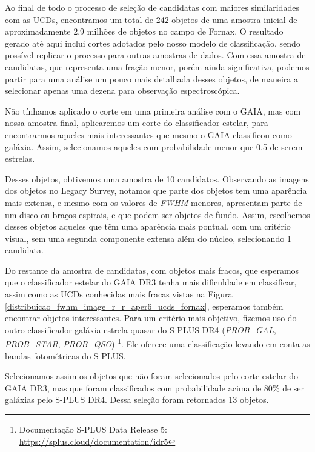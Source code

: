 Ao final de todo o processo de seleção de candidatas com maiores similaridades com as UCDs, encontramos um total de 242 objetos de uma amostra inicial de aproximadamente 2,9 milhões de objetos no campo de Fornax. O resultado gerado até aqui inclui cortes adotados pelo nosso modelo de classificação, sendo possível replicar o processo para outras amostras de dados. Com essa amostra de candidatas, que representa uma fração menor, porém ainda significativa, podemos partir para uma análise um pouco mais detalhada desses objetos, de maneira a selecionar apenas uma dezena para observação espectroscópica.

Não tínhamos aplicado o corte em uma primeira análise com o GAIA, mas com nossa amostra final, aplicaremos um corte do classificador estelar, para encontrarmos aqueles mais interessantes que mesmo o GAIA classificou como galáxia. Assim, selecionamos aqueles com probabilidade menor que 0.5 de serem estrelas.

Desses objetos, obtivemos uma amostra de 10 candidatos. Observando as imagens dos objetos no Legacy Survey, notamos que parte dos objetos tem uma aparência mais extensa, e mesmo com os valores de \textit{FWHM} menores, apresentam parte de um disco ou braços espirais, e que podem ser objetos de fundo. Assim, escolhemos desses objetos aqueles que têm uma aparência mais pontual, com um critério visual, sem uma segunda componente extensa além do núcleo, selecionando 1 candidata. 


Do restante da amostra de candidatas, com objetos mais fracos, que esperamos que o classificador estelar do GAIA DR3 tenha mais dificuldade em classificar, assim como as UCDs conhecidas mais fracas vistas na Figura \ref{distribuicao_fwhm_image_r_r_aper6_ucds_fornax}, esperamos também encontrar objetos interessantes. Para um critério mais objetivo, fizemos uso do outro classificador galáxia-estrela-quasar do S-PLUS DR4 (\textit{PROB\_GAL}, \textit{PROB\_STAR}, \textit{PROB\_QSO}) \citep{lili_classification}\footnote{Documentação S-PLUS Data Release 5: \url{https://splus.cloud/documentation/idr5}}. Ele oferece uma classificação levando em conta as bandas fotométricas do S-PLUS.

Selecionamos assim os objetos que não foram selecionados pelo corte estelar do GAIA DR3, mas que foram classificados com probabilidade acima de 80\% de ser galáxias pelo S-PLUS DR4. Dessa seleção foram retornados 13 objetos.

